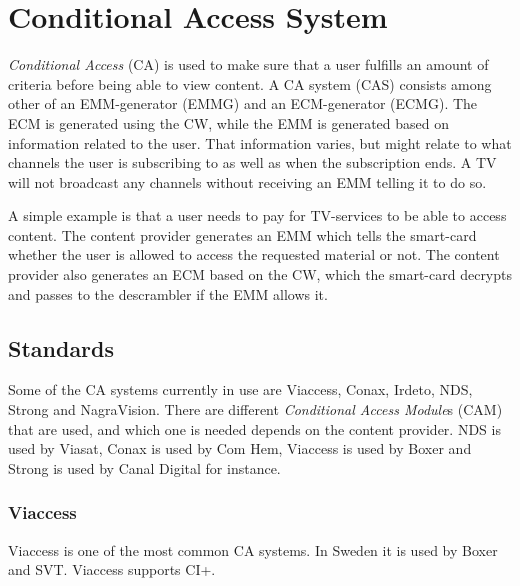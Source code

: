 \section{Conditional Access System} \label{sec:CAS}
\emph{Conditional Access} (CA) is used to make sure that a user fulfills an 
amount of criteria before being able to view content. A CA system (CAS) consists 
among other of an EMM-generator (EMMG) and an ECM-generator (ECMG). %
The ECM is generated using the CW, while the EMM is generated based on 
information related to the user. That information varies, but might relate to 
what channels the user is subscribing to as well as when the subscription ends. 
A TV will not broadcast any channels without receiving an EMM telling it to do 
so.

A simple example is that a user needs to pay for TV-services to be able to access
content. The content provider generates an EMM which tells the smart-card whether
the user is allowed to access the requested material or not. The content provider
also generates an ECM based on the CW, which the smart-card decrypts and passes 
to the descrambler if the EMM allows it.

\subsection{Standards}
Some of the CA systems currently in use are Viaccess, Conax, Irdeto, NDS, Strong 
and NagraVision. There are different \emph{Conditional Access Module}s (CAM) 
that are used, and which one is needed depends on the content provider. NDS is 
used by Viasat, Conax is used by Com Hem, Viaccess is used by Boxer and Strong 
is used by Canal Digital for instance.

\subsubsection{Viaccess}
Viaccess is one of the most common CA systems. In Sweden it is used by Boxer and 
SVT. Viaccess supports CI+.

